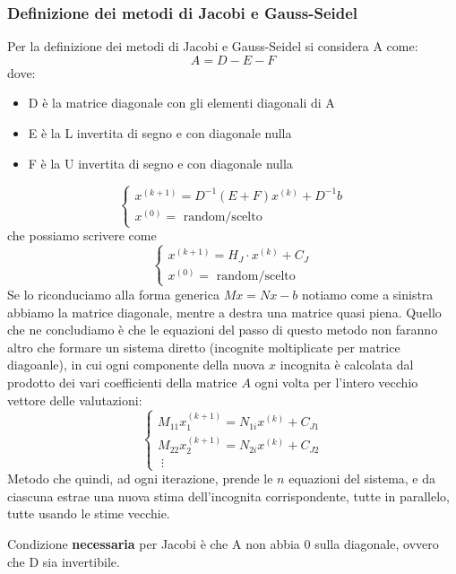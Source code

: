\documentclass[12pt,a4paper,]{report}
\begin{document}
\subsubsection{Definizione dei metodi di Jacobi e Gauss-Seidel}
Per la definizione dei metodi di Jacobi e Gauss-Seidel si considera A come:
\[
A = D - E - F
\]
dove:
\begin{itemize}
    \item D è la matrice diagonale con gli elementi diagonali di A
    \item E è la L invertita di segno e con diagonale nulla
    \item F è la U invertita di segno e con diagonale nulla
\end{itemize}
\begin{metodo}
    \[
    \begin{cases}
    x^{(k+1)} = D^{-1} (E+F)x^{(k)}+D^{-1}b \\
    x^{(0)} = \text{ random/scelto}
    \end{cases}
    \]
    che possiamo scrivere come 
    \[
    \begin{cases}
    x^{(k+1)} = H_J\cdot x^{(k)}+C_J \\
    x^{(0)} = \text{ random/scelto}
    \end{cases}
    \]
    Se lo riconduciamo alla forma generica $Mx = Nx -b$ notiamo come a sinistra abbiamo la matrice diagonale, mentre a destra una matrice quasi piena.
    Quello che ne concludiamo è che le equazioni del passo di questo metodo non faranno altro che formare un sistema diretto (incognite moltiplicate per matrice diagoanle), in cui ogni componente della nuova $x$ incognita è calcolata dal prodotto dei vari coefficienti della matrice $A$ ogni volta per l'intero vecchio vettore delle valutazioni:
    \[
    \begin{cases}
        M_{11}x_1^{(k+1)} = N_{1i} x^{(k)}+C_{J1}\\
        M_{22}x_2^{(k+1)} = N_{2i} x^{(k)}+C_{J2}\\
        \;\vdots
    \end{cases}
    \]
    Metodo che quindi, ad ogni iterazione, prende le $n$ equazioni del sistema, e da ciascuna estrae una nuova stima dell'incognita corrispondente, tutte in parallelo, tutte usando le stime vecchie.
    \begin{nota}
        Condizione \textbf{necessaria} per Jacobi è che A non abbia 0 sulla diagonale, ovvero che D sia invertibile.
    \end{nota}
\end{metodo}
\end{document}
